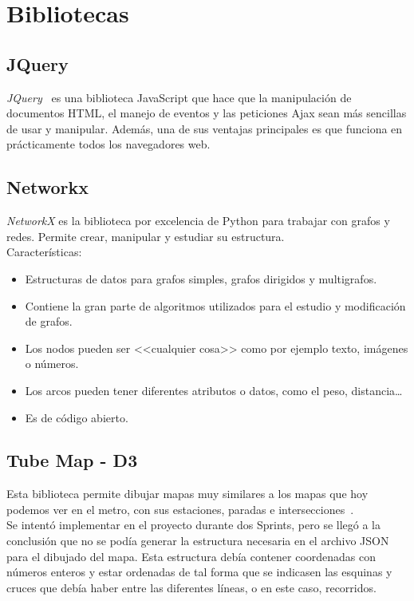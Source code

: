\section{Bibliotecas}

\subsection{JQuery}
\textit{JQuery}~\cite{doc:jquery} es una biblioteca JavaScript que hace que la manipulación de documentos HTML, el manejo de eventos y las peticiones Ajax sean más sencillas de usar y manipular. Además, una de sus ventajas principales es que funciona en prácticamente todos los navegadores web.

\subsection{Networkx}
\textit{NetworkX} es la biblioteca por excelencia de Python para trabajar con grafos y redes. Permite crear, manipular y estudiar su estructura.
\\
Características:
\begin{itemize}
	\item Estructuras de datos para grafos simples, grafos dirigidos y multigrafos.
	\item Contiene la gran parte de algoritmos utilizados para el estudio y modificación de grafos.
	\item Los nodos pueden ser <<cualquier cosa>> como por ejemplo texto, imágenes o números.
	\item Los arcos pueden tener diferentes atributos o datos, como el peso, distancia\dots
	\item Es de código abierto.
\end{itemize}


\subsection{Tube Map - D3}
Esta biblioteca permite dibujar mapas muy similares a los mapas que hoy podemos ver en el metro, con sus estaciones, paradas e intersecciones~\cite{doc:tubemap}.
\\
Se intentó implementar en el proyecto durante dos Sprints, pero se llegó a la conclusión que no se podía generar la estructura necesaria en el archivo JSON para el dibujado del mapa. Esta estructura debía contener coordenadas con números enteros y estar ordenadas de tal forma que se indicasen las esquinas y cruces que debía haber entre las diferentes líneas, o en este caso, recorridos.

